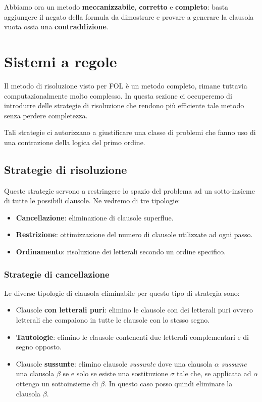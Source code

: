 Abbiamo ora un metodo \textbf{meccanizzabile}, \textbf{corretto} e \textbf{completo}: basta aggiungere il negato
della formula da dimostrare e provare a generare la clausola vuota ossia una \textbf{contraddizione}.

\section{Sistemi a regole}
Il metodo di risoluzione visto per FOL \`e un metodo completo, rimane tuttavia computazionalmente molto
complesso. In questa sezione ci occuperemo di introdurre delle strategie di risoluzione che rendono pi\`u
efficiente tale metodo senza perdere completezza.

Tali strategie ci autorizzano a giustificare una classe di problemi che fanno uso di una contrazione della
logica del primo ordine.

\subsection{Strategie di risoluzione}
Queste strategie servono a restringere lo spazio del problema ad un sotto-insieme di tutte le possibili
clausole. Ne vedremo di tre tipologie:
\begin{itemize}
	\item \textbf{Cancellazione}: eliminazione di clausole superflue.
	\item \textbf{Restrizione}: ottimizzazione del numero di clausole utilizzate ad ogni passo.
	\item \textbf{Ordinamento}: risoluzione dei letterali secondo un ordine specifico.
\end{itemize}

\subsubsection{Strategie di cancellazione}
Le diverse tipologie di clausola eliminabile per questo tipo di strategia sono:
\begin{itemize}
	\item Clausole \textbf{con letterali puri}: elimino le clausole con dei letterali puri ovvero letterali
	      che compaiono in tutte le clausole con lo stesso segno.
	\item \textbf{Tautologie}: elimino le clausole contenenti due letterali complementari e di segno opposto.
	\item Clausole \textbf{sussunte}: elimino clausole \emph{sussunte} dove una clausola $\alpha$
	      \emph{sussume} una clausola $\beta$ se e solo se esiste una sostituzione $\sigma$ tale che, se
	      applicata ad $\alpha$ ottengo un sottoinsieme di $\beta$. In questo caso posso quindi eliminare la
	      clausola $\beta$.
\end{itemize}

